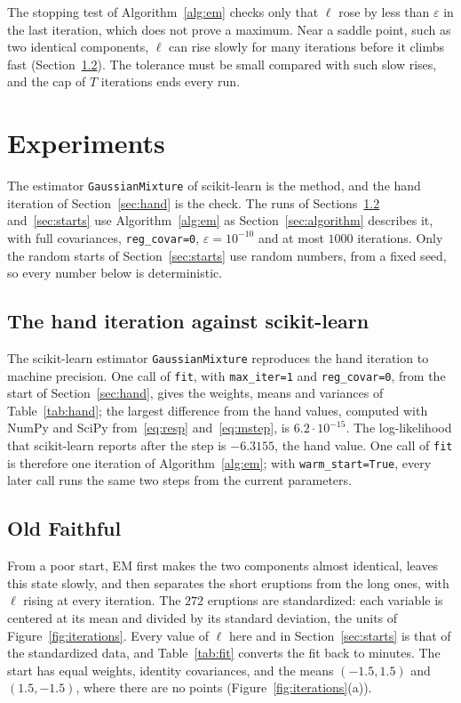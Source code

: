 \documentclass[11pt,a4paper]{amsart}
\numberwithin{equation}{section}
\theoremstyle{plain}
\theoremstyle{definition}
\theoremstyle{remark}
\newcommand{\code}[1]{\texttt{#1}}
\begin{document}
The stopping test of Algorithm~\ref{alg:em} checks only that $\ell$
rose by less than $\varepsilon$ in the last iteration, which does not
prove a maximum. Near a saddle point, such as two identical components,
$\ell$ can rise slowly for many iterations before it climbs fast
(Section~\ref{sec:faithful}). The tolerance must be small compared with
such slow rises, and the cap of $T$ iterations ends every run.

\section{Experiments}\label{sec:experiments}

The estimator \code{GaussianMixture} of scikit-learn is the method, and
the hand iteration of Section~\ref{sec:hand} is the check. The runs of
Sections~\ref{sec:faithful} and~\ref{sec:starts} use
Algorithm~\ref{alg:em} as Section~\ref{sec:algorithm} describes it, with
full covariances, \code{reg\_covar=0}, $\varepsilon = 10^{-10}$ and at
most $1000$ iterations. Only the random starts of
Section~\ref{sec:starts} use random numbers, from a fixed seed, so every
number below is deterministic.

\subsection{The hand iteration against scikit-learn}\label{sec:check}

The scikit-learn estimator \code{GaussianMixture} reproduces the hand
iteration to machine precision. One call of \code{fit}, with \code{max\_iter=1} and \code{reg\_covar=0}, from the
start of Section~\ref{sec:hand}, gives the weights, means and variances
of Table~\ref{tab:hand}; the largest difference from the hand values,
computed with NumPy and SciPy from~\eqref{eq:resp}
and~\eqref{eq:mstep}, is $6.2 \cdot 10^{-15}$. The log-likelihood that
scikit-learn reports after the step is $-6.3155$, the hand value. One
call of \code{fit} is therefore one iteration of Algorithm~\ref{alg:em};
with \code{warm\_start=True}, every later call runs the same two steps
from the current parameters.

\subsection{Old Faithful}\label{sec:faithful}

From a poor start, EM first makes the two components almost identical,
leaves this state slowly, and then separates the short eruptions from
the long ones, with $\ell$ rising at every iteration. The $272$
eruptions are standardized: each variable is centered at its mean and
divided by its standard deviation, the units of
Figure~\ref{fig:iterations}. Every value of $\ell$ here and in
Section~\ref{sec:starts} is that of the standardized data, and
Table~\ref{tab:fit} converts the fit back to minutes. The start has
equal weights, identity covariances, and the means $(-1.5, 1.5)$ and
$(1.5, -1.5)$, where there are no points
(Figure~\ref{fig:iterations}(a)).
\end{document}
